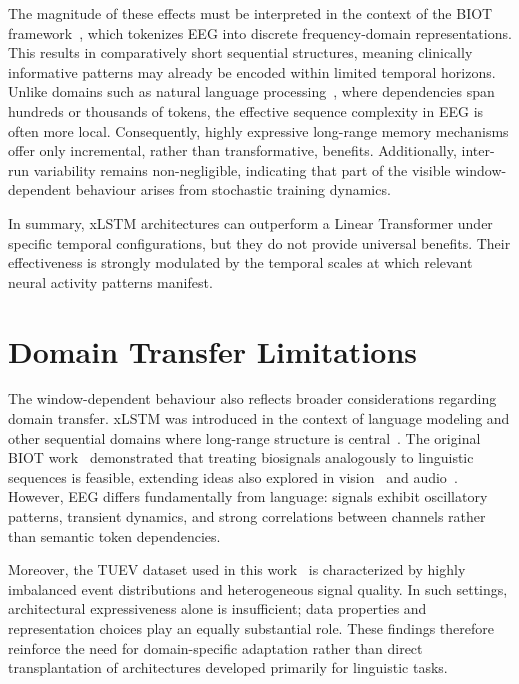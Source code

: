 The magnitude of these effects must be interpreted in the context of the \ac{BIOT} framework~\cite{yang2023biot}, which tokenizes \ac{EEG} into discrete frequency-domain representations. This results in comparatively short sequential structures, meaning clinically informative patterns may already be encoded within limited temporal horizons. Unlike domains such as natural language processing~\cite{vaswani2017attention,beck2024xlstm}, where dependencies span hundreds or thousands of tokens, the effective sequence complexity in \ac{EEG} is often more local. Consequently, highly expressive long-range memory mechanisms offer only incremental, rather than transformative, benefits. Additionally, inter-run variability remains non-negligible, indicating that part of the visible window-dependent behaviour arises from stochastic training dynamics.

In summary, \ac{xLSTM} architectures can outperform a Linear Transformer under specific temporal configurations, but they do not provide universal benefits. Their effectiveness is strongly modulated by the temporal scales at which relevant neural activity patterns manifest.

\section{Domain Transfer Limitations}
\label{sec:domain_transfer}

The window-dependent behaviour also reflects broader considerations regarding domain transfer. \ac{xLSTM} was introduced in the context of language modeling and other sequential domains where long-range structure is central~\cite{beck2024xlstm}. The original \ac{BIOT} work~\cite{yang2023biot} demonstrated that treating biosignals analogously to linguistic sequences is feasible, extending ideas also explored in vision~\cite{dosovitskiy2021vit} and audio~\cite{gong2021ast}. However, \ac{EEG} differs fundamentally from language: signals exhibit oscillatory patterns, transient dynamics, and strong correlations between channels rather than semantic token dependencies.

Moreover, the \ac{TUEV} dataset used in this work~\cite{harati2015improved,obeid2016temple,ferrell2022electrode} is characterized by highly imbalanced event distributions and heterogeneous signal quality. In such settings, architectural expressiveness alone is insufficient; data properties and representation choices play an equally substantial role. These findings therefore reinforce the need for domain-specific adaptation rather than direct transplantation of architectures developed primarily for linguistic tasks.

